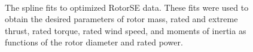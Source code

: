 \begin{figure}[htbp]
   \\
  \caption{\label{rotor_nacelle} The spline fits to optimized RotorSE data. These fits were used to obtain the desired parameters of rotor mass, rated and extreme thrust, rated torque, rated wind speed, and moments of inertia as functions of the rotor diameter and rated power.}
\end{figure}
